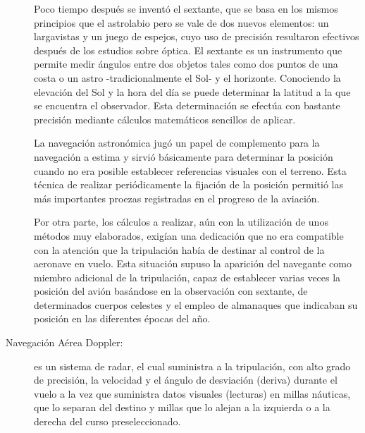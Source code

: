 \documentclass[a4paper,12pt,twoside]{article}
\begin{document}
\begin{description}

Poco tiempo despu\'es se invent\'o el sextante, que se basa en los mismos principios que el astrolabio pero se vale de dos nuevos elementos: un largavistas y un juego de espejos, cuyo uso de precisi\'on resultaron efectivos despu\'es de los estudios sobre \'optica. El sextante es un instrumento que permite medir \'angulos entre dos objetos tales como dos puntos de una costa o un astro -tradicionalmente el Sol- y el horizonte. Conociendo la elevaci\'on del Sol y la hora del d\'ia se puede determinar la latitud a la que se encuentra el observador. Esta determinaci\'on se efect\'ua con bastante precisi\'on mediante c\'alculos matem\'aticos sencillos de aplicar.

La navegaci\'on astron\'omica jug\'o un papel de complemento para la navegaci\'on a estima y sirvi\'o b\'asicamente para determinar la posici\'on cuando no era posible establecer referencias visuales con el terreno. Esta t\'ecnica de realizar peri\'odicamente la fijaci\'on de la posici\'on permiti\'o las m\'as importantes proezas registradas en el progreso de la aviaci\'on.

Por otra parte, los c\'alculos a realizar, a\'un con la utilizaci\'on de unos m\'etodos muy elaborados, exig\'ian una dedicaci\'on que no era compatible con la atenci\'on que la tripulaci\'on hab\'ia de destinar al control de la aeronave en vuelo. Esta situaci\'on supuso la aparici\'on del navegante como miembro adicional de la tripulaci\'on, capaz de establecer varias veces la posici\'on del avi\'on bas\'andose en la observaci\'on con sextante, de determinados cuerpos celestes y el empleo de almanaques que indicaban su posici\'on en las diferentes \'epocas del a\~no.




\item[Navegaci\'on A\'erea Doppler:] es un sistema de radar, el cual suministra a la tripulaci\'on, con alto grado de precisi\'on, la velocidad y el \'angulo de desviaci\'on (deriva) durante el vuelo a la vez que suministra datos visuales (lecturas) en millas n\'auticas, que lo separan del destino y millas que lo alejan a la izquierda o a la derecha del curso preseleccionado.


\end{description}
\end{document}
